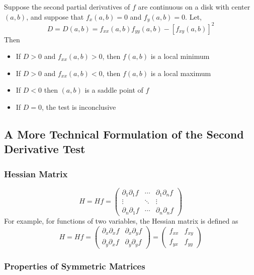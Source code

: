\begin{theorem}
Suppose the second partial derivatives of $f$ are continuous on a disk with center $(a,b)$, and suppose that $f_x(a,b)=0$ and $f_y(a,b)=0$. Let,
$$
D= D(a,b) = f_{xx}(a,b) f_{yy}(a,b) - [f_{xy}(a,b)]^2
$$
Then
\begin{itemize}
    \item If $D>0$ and $f_{xx}(a,b) > 0$, then $f(a,b)$ is a local minimum
    \item If $D>0$ and $f_{xx}(a,b) < 0$, then $f(a,b)$ is a local maximum
    \item If $D<0$ then $(a,b)$ is a saddle point of $f$
    \item If $D=0$, the test is inconclusive
\end{itemize}
\end{theorem}

\subsection{A More Technical Formulation of the Second Derivative Test}

\subsubsection{Hessian Matrix}
\begin{definition}
$$
H = Hf= \left(\begin{array}{ccc}
\partial_1\partial_1 f & \cdots & \partial_1\partial_n f \\
\vdots & \ddots & \vdots \\
\partial_n\partial_1 f & \cdots & \partial_n\partial_n f 
\end{array}
\right)
$$
For example, for functions of two variables, the Hessian matrix is defined as
$$
H = Hf= \left(\begin{array}{ccc}
\partial_x\partial_x f & \partial_x\partial_y f \\
\partial_y\partial_x f & \partial_y\partial_y f
\end{array}
\right) =
\left(\begin{array}{ccc}
f_{xx} & f_{xy} \\
f_{yx} & f_{yy}
\end{array}
\right)
$$
\end{definition}

\subsubsection{Properties of Symmetric Matrices}

